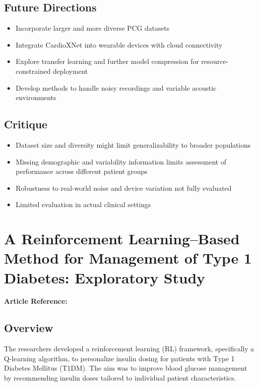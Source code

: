 \subsection*{Future Directions}
\begin{itemize}
    \item Incorporate larger and more diverse PCG datasets
    \item Integrate CardioXNet into wearable devices with cloud connectivity
    \item Explore transfer learning and further model compression for resource-constrained deployment
    \item Develop methods to handle noisy recordings and variable acoustic environments
\end{itemize}

\subsection*{Critique}
\begin{itemize}
    \item Dataset size and diversity might limit generalizability to broader populations
    \item Missing demographic and variability information limits assessment of performance across different patient groups
    \item Robustness to real-world noise and device variation not fully evaluated
    \item Limited evaluation in actual clinical settings
\end{itemize}

\section{A Reinforcement Learning–Based Method for Management of Type 1 Diabetes: Exploratory Study}
\textbf{Article Reference:} \cite{article_7}

\subsection*{Overview}
The researchers developed a reinforcement learning (RL) framework, specifically a Q-learning algorithm, to personalize insulin dosing for patients with Type 1 Diabetes Mellitus (T1DM). The aim was to improve blood glucose management by recommending insulin doses tailored to individual patient characteristics.

